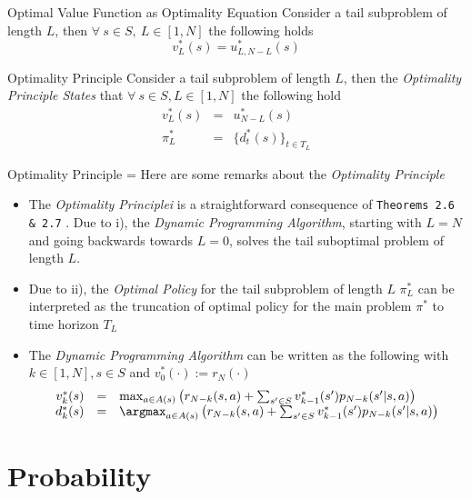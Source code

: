 \documentclass[11pt,a4paper]{article}
\begin{document}
  \begin{theorem}{Optimal Value Function as Optimality Equation}
    Consider a tail subproblem of length $L$, then $\forall\ s\in S,\ L\in[1,N]$ the following holds
    \[ v_L^*(s)=u_{L,N-L}^*(s) \]
  \end{theorem}

  \begin{theorem}{Optimality Principle}
    Consider a tail subproblem of length $L$, then the \textit{Optimality Principle States} that $\forall\ s\in S,L\in[1,N]$ the following hold
    \[\begin{array}{rcl}
      v_L^*(s)&=&u_{N-L}^*(s)\\
      \pi_L^*&=&\{d_t^*(s)\}_{t\in T_L}
    \end{array}\]
  \end{theorem}

  \begin{remark}{Optimality Principle}
    \everymath={\displaystyle}
    Here are some remarks about the \textit{Optimality Principle}
    \begin{itemize}
      \item The \textit{Optimality Principlei} is a straightforward consequence of \texttt{Theorems 2.6 \& 2.7} .
      \ITEM Due to i), the \textit{Dynamic Programming Algorithm}, starting with $L=N$ and going backwards towards $L=0$, solves the tail suboptimal problem of length $L$.
      \item Due to ii), the \textit{Optimal Policy} for the tail subproblem of length $L$ $\pi_L^*$ can be interpreted as the truncation of optimal policy for the main problem $\pi^*$ to time horizon $T_L$
      \item The \textit{Dynamic Programming Algorithm} can be written as the following with $k\in[1,N],s\in S$ and $v_0^*(\cdot):=r_N(\cdot)$
      \[\begin{array}{rcl}
        v_k^*(s)&=&\max_{a\in A(s)}\left(r_{N-k}(s,a)+\sum_{s'\in S}v_{k-1}^*(s')p_{N-k}(s'|s,a)\right)\\
        d_k^*(s)&=&\argmax_{a\in A(s)}\left(r_{N-k}(s,a)+\sum_{s'\in S}v_{k-1}^*(s')p_{N-k}(s'|s,a)\right)
      \end{array}\]
    \end{itemize}
  \end{remark}

\section{Probability}
\end{document}
